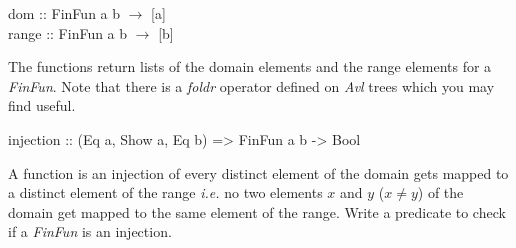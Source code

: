 \documentclass[11pt]{article}
\begin{document}
\begin{exercise}
\begin{smallprogram*}
\>  dom :: FinFun a b $\rightarrow$ [a] \\
\>  range :: FinFun a b $\rightarrow$ [b] \\
\end{smallprogram*} 
The functions return lists of the domain elements and the range elements for a
{\it{FinFun}}.  Note that there is a {\it{foldr}} operator defined on
{\it{Avl}} trees which you may find useful.

\begin{smallprogram*}
\>  injection :: (Eq a, Show a, Eq b) => FinFun a b -> Bool\\
\end{smallprogram*} 
A function is an injection of every distinct element of the domain gets mapped
to a distinct element of the range {\em{i.e.}} no two elements $x$ and $y$
($x\not=y$) of the domain get mapped to the same element of the range.  Write a
predicate to check if a {\it{FinFun}} is an injection. 






\end{exercise}
\end{document}
